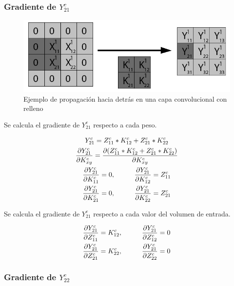 \subsubsection{Gradiente de $Y^c_{21}$}

\begin{figure}[H]
	\centering
	\includegraphics[width=0.8\linewidth]{imagenes/conv_back_padding_4.jpg} 
	\caption{Ejemplo de propagación hacia detrás en una capa convolucional con relleno}
\end{figure}

Se calcula el gradiente de $Y^c_{21}$ respecto a cada peso.

\begin{gather}
	Y^c_{21} = Z^c_{11} * K^c_{12} + Z^c_{21} * K^c_{22} \\
	\frac{\partial Y^c_{21}}{\partial K^c_{xy}} = \frac{\partial (Z^c_{11} * K^c_{12} + Z^c_{21} * K^c_{22})}{\partial K^c_{xy}} \\
	\frac{\partial Y^c_{21}}{\partial K^c_{11}} = 0, \hspace{10mm} \frac{\partial Y^c_{21}}{\partial K^c_{12}} = Z^c_{11} \\
	\frac{\partial Y^c_{21}}{\partial K^c_{21}} = 0, \hspace{10mm} \frac{\partial Y^c_{21}}{\partial K^c_{22}} = Z^c_{21}
\end{gather}

Se calcula el gradiente de $Y^c_{21}$ respecto a cada valor del volumen de entrada.

\begin{gather}
	\frac{\partial Y^c_{21}}{\partial Z^c_{11}} = K^c_{12}, \hspace{10mm} \frac{\partial Y^c_{21}}{\partial Z^c_{12}} = 0\\
	\frac{\partial Y^c_{21}}{\partial Z^c_{21}} = K^c_{22}, \hspace{10mm} \frac{\partial Y^c_{21}}{\partial Z^c_{22}} = 0
\end{gather}

\subsubsection{Gradiente de $Y^c_{22}$}

